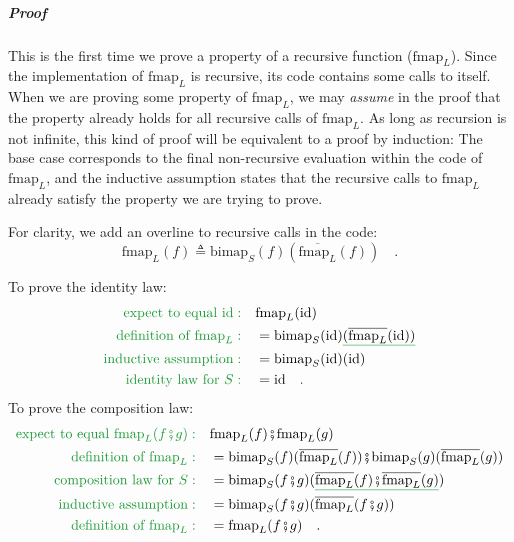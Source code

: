 \subparagraph{Proof}

This is the first time we prove a property of a recursive function
($\text{fmap}_{L}$). Since the implementation of $\text{fmap}_{L}$
is recursive, its code contains some calls to itself. When we are
proving some property of $\text{fmap}_{L}$, we may \emph{assume}
in the proof that the property already holds for all recursive calls
of $\text{fmap}_{L}$. As long as recursion is not infinite, this
kind of proof will be equivalent to a proof by induction: The base
case corresponds to the final non-recursive evaluation within the
code of $\text{fmap}_{L}$, and the inductive assumption states that
the recursive calls to $\text{fmap}_{L}$ already satisfy the property
we are trying to prove.

For clarity, we add an overline to recursive calls in the code:
\[
\text{fmap}_{L}(f)\triangleq\text{bimap}_{S}(f)(\overline{\text{fmap}_{L}}(f))\quad.
\]

To prove the identity law:
\begin{align*}
{\color{greenunder}\text{expect to equal }\text{id}:}\quad & \text{fmap}_{L}(\text{id})\\
{\color{greenunder}\text{definition of }\text{fmap}_{L}:}\quad & =\text{bimap}_{S}(\text{id})\gunderline{(\overline{\text{fmap}_{L}}(\text{id}))}\\
{\color{greenunder}\text{inductive assumption}:}\quad & =\text{bimap}_{S}(\text{id})(\text{id})\\
{\color{greenunder}\text{identity law for }S:}\quad & =\text{id}\quad.
\end{align*}
To prove the composition law:
\begin{align*}
{\color{greenunder}\text{expect to equal }\text{fmap}_{L}(f\bef g):}\quad & \text{fmap}_{L}(f)\bef\text{fmap}_{L}(g)\\
{\color{greenunder}\text{definition of }\text{fmap}_{L}:}\quad & =\text{bimap}_{S}(f)(\overline{\text{fmap}_{L}}(f))\bef\text{bimap}_{S}(g)(\overline{\text{fmap}_{L}}(g))\\
{\color{greenunder}\text{composition law for }S:}\quad & =\text{bimap}_{S}(f\bef g)(\gunderline{\overline{\text{fmap}_{L}}(f)\bef\overline{\text{fmap}_{L}}(g)})\\
{\color{greenunder}\text{inductive assumption}:}\quad & =\text{bimap}_{S}(f\bef g)(\overline{\text{fmap}_{L}}(f\bef g))\\
{\color{greenunder}\text{definition of }\text{fmap}_{L}:}\quad & =\text{fmap}_{L}(f\bef g)\quad.
\end{align*}

